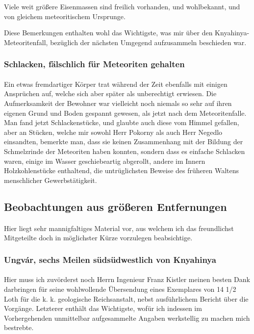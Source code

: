 \documentclass[a4paper, 11pt, oneside, german]{article}
\begin{document}
Viele weit größere Eisenmassen sind freilich vorhanden, und wohlbekannt, und von gleichem meteoritischem Ursprunge.

Diese Bemerkungen enthalten wohl das Wichtigste, was mir über den Knyahinya-Meteoritenfall, bezüglich der nächsten Umgegend aufzusammeln beschieden war.
\clearpage
\subsubsection{Schlacken, fälschlich für Meteoriten gehalten}
\paragraph{}
Ein etwas fremdartiger Körper trat während der Zeit ebenfalls mit einigen Ansprüchen auf, welche sich aber später als unberechtigt erwiesen. Die Aufmerksamkeit der Bewohner war vielleicht noch niemals so sehr auf ihren eigenen Grund und Boden gespannt gewesen, als jetzt nach dem Meteoritenfalle. Man fand jetzt Schlackenstücke, und glaubte auch diese vom Himmel gefallen, aber an Stücken, welche mir sowohl Herr Pokorny als auch Herr Negedlo einsandten, bemerkte man, dass sie keinen Zusammenhang mit der Bildung der Schmelzrinde der Meteoriten haben konnten, sondern dass es einfache Schlacken waren, einige im Wasser geschiebeartig abgerollt, andere im Innern Holzkohlenstücke enthaltend, die untrüglichsten Beweise des früheren Waltens menschlicher Gewerbstätigkeit.
\clearpage
\subsection{Beobachtungen aus größeren Entfernungen}
\paragraph{}
Hier liegt sehr mannigfaltiges Material vor, aus welchem ich das freundlichst Mitgeteilte doch in möglichster Kürze vorzulegen beabsichtige.
\subsubsection{Ungvár, sechs Meilen südsüdwestlich von Knyahinya}
\paragraph{}
Hier muss ich zuvörderst noch Herrn Ingenieur Franz Kistler meinen besten Dank darbringen für seine wohlwollende Übersendung eines Exemplares von 14 1/2 Loth für die k. k. geologische Reichsanstalt, nebst ausführlichem Bericht über die Vorgänge. Letzterer enthält das Wichtigste, wofür ich indessen im Vorhergehenden unmittelbar aufgesammelte Angaben werkstellig zu machen mich bestrebte.
\end{document}
